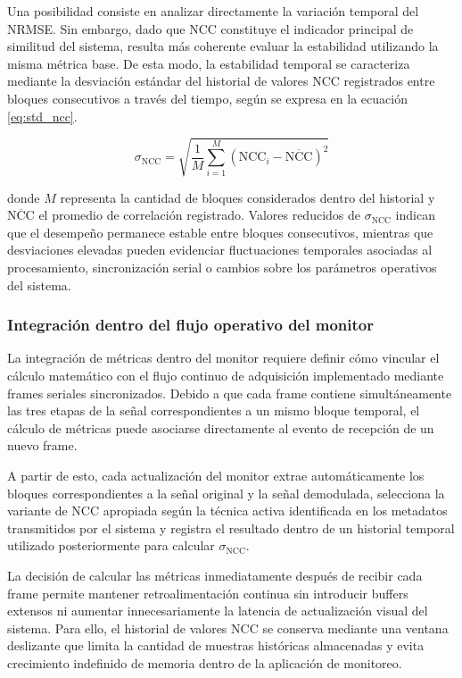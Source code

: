 Una posibilidad consiste en analizar directamente la variación temporal del NRMSE. Sin embargo, dado que NCC constituye el indicador principal de similitud del sistema, resulta más coherente evaluar la estabilidad utilizando la misma métrica base. De esta modo, la estabilidad temporal se caracteriza mediante la desviación estándar del historial de valores NCC registrados entre bloques consecutivos a través del tiempo, según se expresa en la ecuación \ref{eq:std_ncc}.

\begin{equation}
\sigma_{\text{NCC}} = \sqrt{\frac{1}{M}\sum_{i=1}^{M}
\left(\text{NCC}_i - \overline{\text{NCC}}\right)^2}
\label{eq:std_ncc}
\end{equation}

donde $M$ representa la cantidad de bloques considerados dentro del historial y $\overline{\text{NCC}}$ el promedio de correlación registrado. Valores reducidos de $\sigma_{\text{NCC}}$ indican que el desempeño permanece estable entre bloques consecutivos, mientras que desviaciones elevadas pueden evidenciar fluctuaciones temporales asociadas al procesamiento, sincronización serial o cambios sobre los parámetros operativos del sistema.

\subsubsection{Integración dentro del flujo operativo del monitor}

La integración de métricas dentro del monitor requiere definir cómo vincular el cálculo matemático con el flujo continuo de adquisición implementado mediante frames seriales sincronizados. Debido a que cada frame contiene simultáneamente las tres etapas de la señal correspondientes a un mismo bloque temporal, el cálculo de métricas puede asociarse directamente al evento de recepción de un nuevo frame.

A partir de esto, cada actualización del monitor extrae automáticamente los bloques correspondientes a la señal original y la señal demodulada, selecciona la variante de NCC apropiada según la técnica activa identificada en los metadatos transmitidos por el sistema y registra el resultado dentro de un historial temporal utilizado posteriormente para calcular $\sigma_{\text{NCC}}$.

La decisión de calcular las métricas inmediatamente después de recibir cada frame permite mantener retroalimentación continua sin introducir buffers extensos ni aumentar innecesariamente la latencia de actualización visual del sistema. Para ello, el historial de valores NCC se conserva mediante una ventana deslizante que limita la cantidad de muestras históricas almacenadas y evita crecimiento indefinido de memoria dentro de la aplicación de monitoreo.

